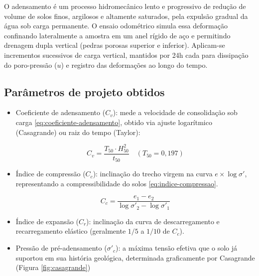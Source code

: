 
O adensamento é um processo hidromecânico lento e progressivo de redução de volume de solos finos, argilosos e altamente saturados, pela expulsão gradual da água sob carga permanente. O ensaio odométrico \cite{mb33336} simula essa deformação confinando lateralmente a amostra em um anel rígido de aço e permitindo drenagem dupla vertical (pedras porosas superior e inferior). Aplicam-se incrementos sucessivos de carga vertical, mantidos por 24h cada para dissipação do poro-pressão ($u$) e registro das deformações ao longo do tempo.

\subsection{Parâmetros de projeto obtidos}

\begin{itemize}
    
    \item Coeficiente de adensamento ($C_v$): mede a velocidade de consolidação sob carga \ref{eq:coeficiente-adensamento}, obtido via ajuste logarítmico (Casagrande) ou raiz do tempo (Taylor):

        $$C_v=\frac{T_{50}\cdot H^2_{50}}{t_{50}} \quad (T_{50}=0,197)$$
        \label{eq:coeficiente-adensamento}
        
    \item Índice de compressão ($C_c$): inclinação do trecho virgem na curva $ e \times \log \sigma'$, representando a compressibilidade do solos \ref{eq:indice-compressao}.

        $$C_c=\frac{e_1-e_2}{\log \sigma'_2-\log \sigma'_1}$$
        \label{eq:indice-compressao}
        
    \item Índice de expansão ($C_r$): inclinação da curva de descarregamento e recarregamento elástico (geralmente $1/5$ a $1/10$ de $C_c$).
    
    \item Pressão de pré-adensamento ($\sigma'_c$): a máxima tensão efetiva que o solo já suportou em sua história geológica, determinada graficamente por Casagrande (Figura \ref{fig:casagrande})
\end{itemize}

